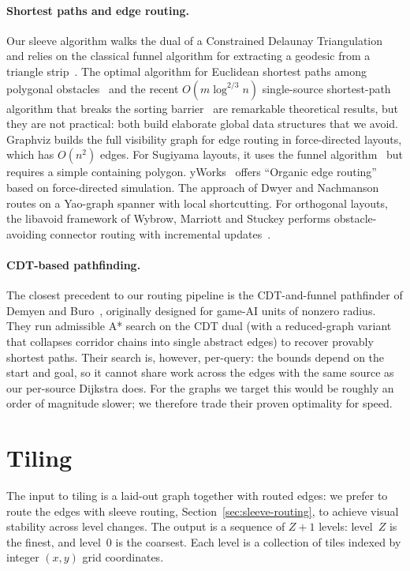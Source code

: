 \documentclass[a4paper,USenglish,anonymous]{gd-lipics-v3}
\begin{document}
\paragraph{Shortest paths and edge routing.}
Our sleeve algorithm walks the dual of a Constrained Delaunay
Triangulation~\cite{shewchuk2002delaunay} and relies on the classical
funnel algorithm for extracting a geodesic from a triangle
strip~\cite{lee1984euclidean,chazelle1982theorem,guibas1987linear,pathOpt}.
The optimal algorithm for Euclidean shortest paths among polygonal
obstacles~\cite{hershberger1999optimal} and the recent
$O(m\log^{2/3} n)$ single-source shortest-path algorithm that breaks
the sorting barrier~\cite{duan2025sorting} are remarkable theoretical
results, but they are not practical: both build elaborate global data
structures that we avoid.
Graphviz builds the full visibility graph for edge routing in force-directed layouts, which has $O(n^2)$ edges. For Sugiyama layouts, it uses the funnel algorithm~\cite{dobkin1997implementing} but requires a simple containing polygon. yWorks~\cite{yworks} offers ``Organic edge routing'' based on force-directed simulation. The approach of Dwyer and Nachmanson~\cite{dwyer2010fast} routes on a Yao-graph spanner with local shortcutting. For orthogonal layouts, the libavoid framework of Wybrow, Marriott and Stuckey performs obstacle-avoiding connector routing with incremental updates~\cite{wybrow2010orthogonal}.

\paragraph{CDT-based pathfinding.}
The closest precedent to our routing pipeline is the CDT-and-funnel
pathfinder of Demyen and Buro~\cite{demyen2006efficient}, originally
designed for game-AI units of nonzero radius. They run admissible A*
search on the CDT dual (with a reduced-graph variant that collapses
corridor chains into single abstract edges) to recover provably
shortest paths. Their search is, however, per-query: the bounds depend
on the start and goal, so it cannot share work across the edges with
the same source as our per-source Dijkstra does. For the graphs we
target this would be roughly an order of magnitude slower; we
therefore trade their proven optimality for speed.


\section{Tiling}
\label{sec:tiling}
The input to tiling is a laid-out graph together with routed edges: we
prefer to route the edges with sleeve routing,
Section~\ref{sec:sleeve-routing}, to achieve visual stability across
level changes. The output is a sequence of $Z{+}1$ levels: level~$Z$
is the finest, and level~$0$ is the coarsest. Each level is a
collection of tiles indexed by integer $(x,y)$ grid coordinates.
\end{document}
